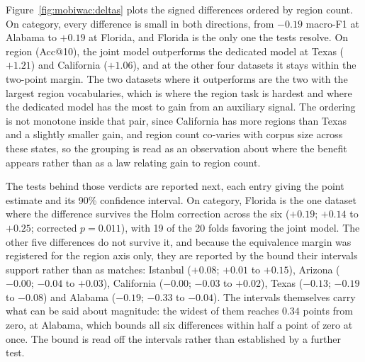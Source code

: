 Figure~\ref{fig:mobiwac:deltas} plots the signed differences ordered by region count. On
category, every difference is small in both directions, from $-0.19$ macro-F1 at Alabama to
$+0.19$ at Florida, and Florida is the only one the tests resolve.
On region (Acc@10), the joint model outperforms the dedicated model at Texas ($+1.21$) and
California ($+1.06$), and at the other four datasets it stays within the two-point margin. The two
datasets where it outperforms are the two with the largest region vocabularies, which is where the
region task is hardest and where the dedicated model has the most to gain from an auxiliary signal.
The ordering is not monotone inside that pair, since California has more regions than Texas and a
slightly smaller gain, and region count co-varies with corpus size across these states, so the
grouping is read as an observation about where the benefit appears rather than as a law relating
gain to region count.

The tests behind those verdicts are reported next, each entry giving the point estimate and its
90\% confidence interval. On category, Florida is the one dataset where the difference survives the
Holm correction across the six ($+0.19$; $+0.14$ to $+0.25$; corrected $p=0.011$), with 19 of the
20 folds favoring the joint model. The other five differences do not survive it, and because the
equivalence margin was registered for the region axis only, they are reported by the bound their intervals support
rather than as matches: Istanbul ($+0.08$; $+0.01$ to $+0.15$), Arizona ($-0.00$; $-0.04$ to
$+0.03$), California ($-0.00$; $-0.03$ to $+0.02$), Texas ($-0.13$; $-0.19$ to $-0.08$) and Alabama
($-0.19$; $-0.33$ to $-0.04$). %
The intervals themselves carry what can be said about magnitude:
the widest of them reaches $0.34$ points from zero, at Alabama, which bounds all six differences
within half a point of zero at once. The bound is read off the intervals rather than established by a
further test.

